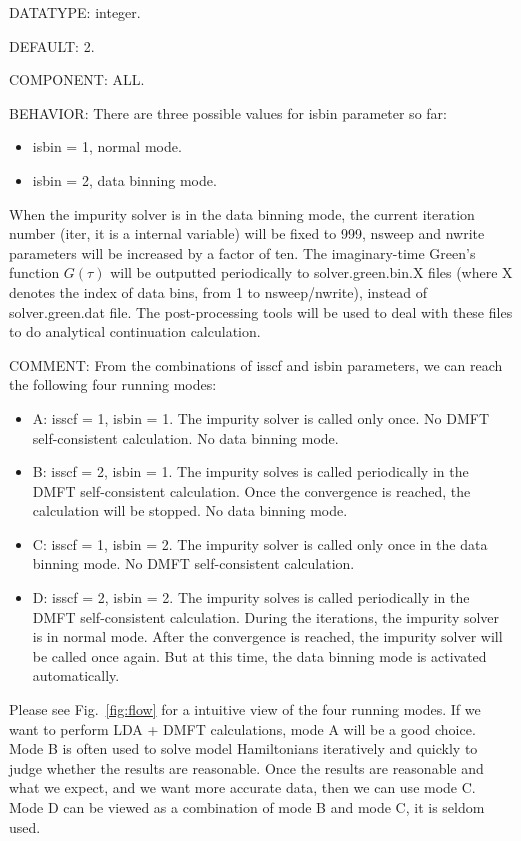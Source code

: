 {\color{green}DATATYPE:} integer.

{\color{blue}DEFAULT:} 2.

{\color{brown}COMPONENT:} ALL.

{\color{purple}BEHAVIOR:} There are three possible values for isbin parameter so far:
\begin{itemize}
\item isbin = 1, normal mode.
\item isbin = 2, data binning mode.
\end{itemize}
When the impurity solver is in the data binning mode, the current iteration number (iter, it is a internal variable) will be fixed to 999, nsweep and nwrite parameters will be increased by a factor of ten. The imaginary-time Green's function $G(\tau)$ will be outputted periodically to solver.green.bin.X files (where X denotes the index of data bins, from 1 to nsweep/nwrite), instead of solver.green.dat file. The post-processing tools will be used to deal with these files to do analytical continuation calculation.

{\color{olive}COMMENT:} From the combinations of isscf and isbin parameters, we can reach the following four running modes:
\begin{itemize}
\item A: isscf = 1, isbin = 1. The impurity solver is called only once. No DMFT self-consistent calculation. No data binning mode.
\item B: isscf = 2, isbin = 1. The impurity solves is called periodically in the DMFT self-consistent calculation. Once the convergence is reached, the calculation will be stopped. No data binning mode.   
\item C: isscf = 1, isbin = 2. The impurity solver is called only once in the data binning mode. No DMFT self-consistent calculation.
\item D: isscf = 2, isbin = 2. The impurity solves is called periodically in the DMFT self-consistent calculation. During the iterations, the impurity solver is in normal mode. After the convergence is reached, the impurity solver will be called once again. But at this time, the data binning mode is activated automatically.
\end{itemize}

Please see Fig.~\ref{fig:flow} for a intuitive view of the four running modes. If we want to perform LDA + DMFT calculations, mode A will be a good choice. Mode B is often used to solve model Hamiltonians iteratively and quickly to judge whether the results are reasonable. Once the results are reasonable and what we expect, and we want more accurate data, then we can use mode C. Mode D can be viewed as a combination of mode B and mode C, it is seldom used.

